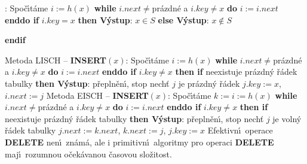:\newline 
Spo\v c\'\i t\'ame $i:=h\left(x\right)$\newline 
{\bf while} $i.next\ne$pr\'azdn\'e a $i.key\ne x$ {\bf do} $i:=i.next$ {\bf enddo \newline 
if} $i.key=x$ {\bf then V\'ystup}: $x\in S$ {\bf else V\'ystup}: $
x\notin S$ {\bf endif
\medskip

}\flushpar Metoda LISCH -- {\bf INSERT$\left(x\right)$}:\newline 
Spo\v c\'\i t\'ame $i:=h\left(x\right)$\newline 
{\bf while} $i.next\ne$pr\'azdn\'e a $i.key\ne x$ {\bf do} $i:=i.next$ {\bf enddo \newline 
if} $i.key\ne x$ {\bf then\newline 
\phantom{{\rm ---}}if} neexistuje pr\'azdn\'y \v r\'adek tabulky {\bf then\newline 
\phantom{{\rm ------}}V\'ystup}: p\v repln\v en\'\i , stop\newline 
{}nech\v t $j$ je pr\'azdn\'y \v r\'adek $j.
key:=x$, 
$i.next:=j$\newline 
\phantom{---}{\bf endif\newline 
endif
\medskip

}\flushpar Metoda EISCH -- {\bf INSERT$\left(x\right)$}:\newline 
Spo\v c\'\i t\'ame $k:=i:=h\left(x\right)$\newline 
{\bf while} $i.next\ne$pr\'azdn\'e a $i.key\ne x$ {\bf do} $i:=i.next$ {\bf enddo \newline 
if} $i.key\ne x$ {\bf then\newline 
\phantom{{\rm ---}}if} neexistuje pr\'azdn\'y \v r\'adek tabulky {\bf then\newline 
\phantom{{\rm ------}}V\'ystup}: p\v repln\v en\'\i , stop\newline 
{}nech\v t $j$ je voln\'y \v r\'adek tabulky\newline 
\phantom{------}$j.next:=k.next$, $k.next:=j$, $j.key:=x$\newline 
\phantom{---}{\bf endif\newline 
endif
\medskip

}\flushpar Efektivn\'\i\ operace {\bf DELETE}  nen\'\i\ zn\'am\'a, ale i primitivn\'\i\ 
algoritmy pro operaci {\bf DELETE} maj\'\i\ rozumnou o\v cek\'avanou 
\v casovou slo\v zitost.
\medskip

